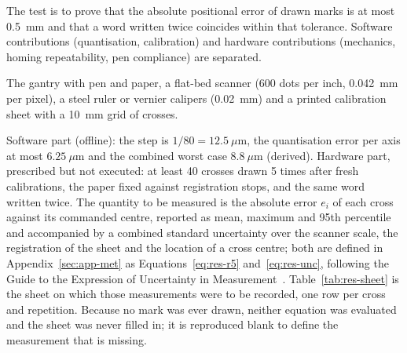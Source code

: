 \medskip
\label{sec:res-qtp5}


            The test is to prove that the absolute positional error of drawn marks is at most 0.5~mm and that a word written twice coincides within that tolerance.
            Software contributions (quantisation, calibration) and hardware contributions (mechanics, homing repeatability, pen compliance) are separated.


            The gantry with pen and paper, a flat-bed scanner (600 dots per inch, 0.042~mm per pixel), a steel ruler or vernier calipers (0.02~mm) and a printed calibration sheet with a 10~mm grid of crosses.


            Software part (offline): the step is $1/80=12.5~\mu$m, the quantisation error per axis at most $6.25~\mu$m and the combined worst case $8.8~\mu$m (derived).
            Hardware part, prescribed but not executed: at least 40 crosses drawn 5 times after fresh calibrations, the paper fixed against registration stops, and the same word written twice.
            The quantity to be measured is the absolute error $e_i$ of each cross against its commanded centre, reported as mean, maximum and 95th percentile and accompanied by a combined standard uncertainty over the scanner scale, the registration of the sheet and the location of a cross centre; both are defined in Appendix~\ref{sec:app-met} as Equations~\ref{eq:res-r5} and~\ref{eq:res-unc}, following the Guide to the Expression of Uncertainty in Measurement~\cite[Clause~5]{jcgm2008}.
            Table~\ref{tab:res-sheet} is the sheet on which those measurements were to be recorded, one row per cross and repetition. Because no mark was ever drawn, neither equation was evaluated and the sheet was never filled in; it is reproduced blank to define the measurement that is missing.



